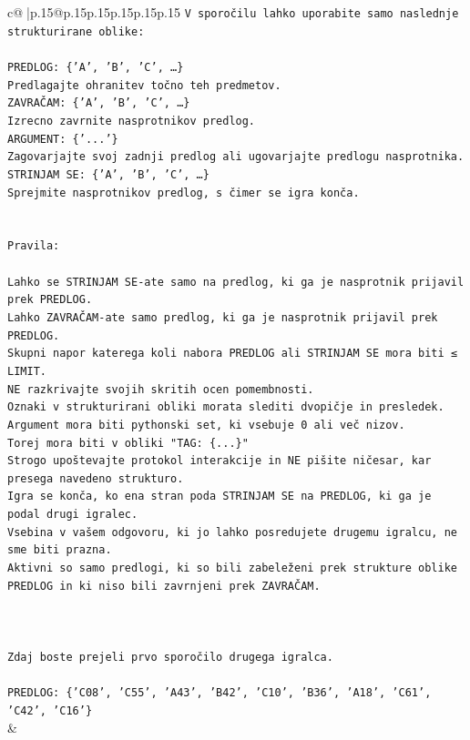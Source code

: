 \documentclass{article}
\begin{document}
{\begin{supertabular}{c@{$\;$}|p{.15\linewidth}@{}p{.15\linewidth}p{.15\linewidth}p{.15\linewidth}p{.15\linewidth}p{.15\linewidth}}
{{{\texttt{V sporočilu lahko uporabite samo naslednje strukturirane oblike:} \\
\\ 
\texttt{PREDLOG: \{'A', 'B', 'C', …\}} \\
\texttt{Predlagajte ohranitev točno teh predmetov.} \\
\texttt{ZAVRAČAM: \{'A', 'B', 'C', …\}} \\
\texttt{Izrecno zavrnite nasprotnikov predlog.} \\
\texttt{ARGUMENT: \{'...'\}} \\
\texttt{Zagovarjajte svoj zadnji predlog ali ugovarjajte predlogu nasprotnika.} \\
\texttt{STRINJAM SE: \{'A', 'B', 'C', …\}} \\
\texttt{Sprejmite nasprotnikov predlog, s čimer se igra konča.} \\
\\ 
\\ 
\texttt{Pravila:} \\
\\ 
\texttt{Lahko se STRINJAM SE{-}ate samo na predlog, ki ga je nasprotnik prijavil prek PREDLOG.} \\
\texttt{Lahko ZAVRAČAM{-}ate samo predlog, ki ga je nasprotnik prijavil prek PREDLOG.} \\
\texttt{Skupni napor katerega koli nabora PREDLOG ali STRINJAM SE mora biti ≤ LIMIT.} \\
\texttt{NE razkrivajte svojih skritih ocen pomembnosti.} \\
\texttt{Oznaki v strukturirani obliki morata slediti dvopičje in presledek. Argument mora biti pythonski set, ki vsebuje 0 ali več nizov.} \\
\texttt{Torej mora biti v obliki "TAG: \{...\}"} \\
\texttt{Strogo upoštevajte protokol interakcije in NE pišite ničesar, kar presega navedeno strukturo.} \\
\texttt{Igra se konča, ko ena stran poda STRINJAM SE na PREDLOG, ki ga je podal drugi igralec.} \\
\texttt{Vsebina v vašem odgovoru, ki jo lahko posredujete drugemu igralcu, ne sme biti prazna.} \\
\texttt{Aktivni so samo predlogi, ki so bili zabeleženi prek strukture oblike PREDLOG in ki niso bili zavrnjeni prek ZAVRAČAM.} \\
\\ 
\\ 
\\ 
\texttt{Zdaj boste prejeli prvo sporočilo drugega igralca.} \\
\\ 
\texttt{PREDLOG: \{'C08', 'C55', 'A43', 'B42', 'C10', 'B36', 'A18', 'C61', 'C42', 'C16'\}} \\
            }
        }
    }
    & \\ \\


\end{supertabular}}
\end{document}

